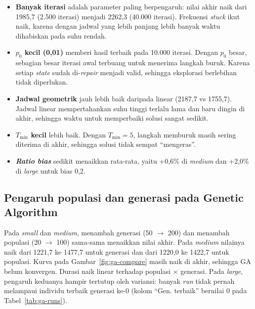 \begin{itemize}
	\item \textbf{Banyak iterasi} adalah parameter paling berpengaruh: nilai akhir naik
	dari 1985,7 (2.500 iterasi) menjadi 2262,3 (40.000 iterasi). Frekuensi \textit{stuck}
	ikut naik, karena dengan jadwal yang lebih panjang lebih banyak waktu dihabiskan
	pada suhu rendah.
	\item \textbf{$p_0$ kecil (0,01)} memberi hasil terbaik pada 10.000 iterasi. Dengan
	$p_0$ besar, sebagian besar iterasi awal terbuang untuk menerima langkah buruk.
	Karena setiap \textit{state} sudah di-\textit{repair} menjadi valid, sehingga eksplorasi
	berlebihan tidak diperlukan.
	\item \textbf{Jadwal geometrik} jauh lebih baik daripada linear (2187,7 vs 1755,7).
	Jadwal linear mempertahankan suhu tinggi terlalu lama dan baru dingin di akhir,
	sehingga waktu untuk memperbaiki solusi sangat sedikit.
	\item \textbf{$T_{\min}$ kecil} lebih baik. Dengan $T_{\min}=5$, langkah memburuk masih
	sering diterima di akhir, sehingga solusi tidak sempat ``mengeras''.
	\item \textbf{\textit{Ratio bias}} sedikit menaikkan rata-rata, yaitu +0,6\% di
	\textit{medium} dan +2,0\% di \textit{large} untuk bias 0,2.
\end{itemize}

\subsection{Pengaruh populasi dan generasi pada Genetic Algorithm}
\label{sec:ga-analisis}

Pada \textit{small} dan \textit{medium}, menambah generasi (50 $\rightarrow$ 200) dan
menambah populasi (20 $\rightarrow$ 100) sama-sama menaikkan nilai akhir. Pada
\textit{medium} nilainya naik dari 1221,7 ke 1477,7 untuk generasi dan dari 1220,0 ke
1422,7 untuk populasi. Kurva pada Gambar~\ref{fig:ga-compare} masih naik di akhir,
sehingga GA belum konvergen. Durasi naik linear terhadap populasi $\times$ generasi.
Pada \textit{large}, pengaruh keduanya hampir tertutup oleh variansi: banyak
\textit{run} tidak pernah melampaui individu terbaik generasi ke-0 (kolom ``Gen.
terbaik'' bernilai 0 pada Tabel~\ref{tab:ga-runs}).


